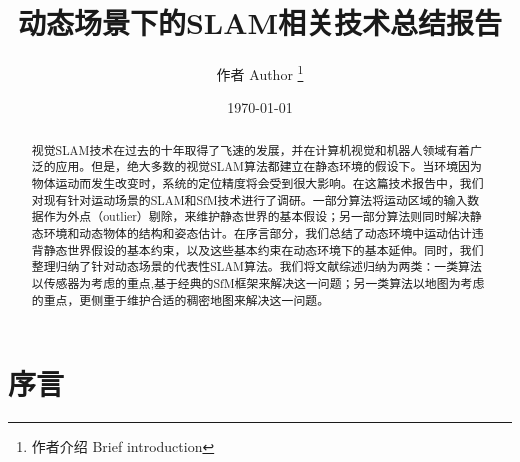 \documentclass[12pt,a4paper]{article}
\title{动态场景下的SLAM相关技术总结报告}
\author{ 作者 Author \thanks{作者介绍 Brief introduction} }
\date{\today}
\begin{document}
\begin{abstract}
	视觉SLAM技术在过去的十年取得了飞速的发展，并在计算机视觉和机器人领域有着广泛的应用。但是，绝大多数的视觉SLAM算法都建立在静态环境的假设下。当环境因为物体运动而发生改变时，系统的定位精度将会受到很大影响。在这篇技术报告中，我们对现有针对运动场景的SLAM和SfM技术进行了调研。一部分算法将运动区域的输入数据作为外点（outlier）剔除，来维护静态世界的基本假设；另一部分算法则同时解决静态环境和动态物体的结构和姿态估计。在序言部分，我们总结了动态环境中运动估计违背静态世界假设的基本约束，以及这些基本约束在动态环境下的基本延伸。同时，我们整理归纳了针对动态场景的代表性SLAM算法。我们将文献综述归纳为两类：一类算法以传感器为考虑的重点,基于经典的SfM框架来解决这一问题；另一类算法以地图为考虑的重点，更侧重于维护合适的稠密地图来解决这一问题。	
\end{abstract}

\maketitle
\section{序言}
\label{sec:preliminaries}

\label{sec:slam}

%
%
%
%


%
%
%



	
\end{document}
